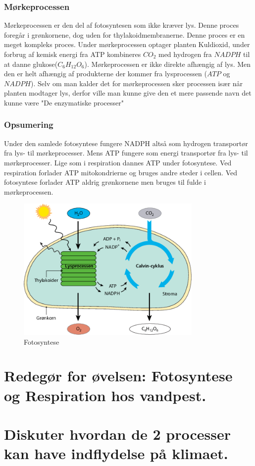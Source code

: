             \subsubsection{Mørkeprocessen}
                Mørkeprocessen er den del af fotosyntesen som ikke kræver lys. Denne proces foregår i grønkornene, dog uden for thylakoidmembranerne. Denne proces er en meget kompleks proces. 
                Under mørkeprocessen optager planten Kuldioxid, under forbrug af kemisk energi fra ATP kombineres \begin{math}CO_2\end{math} med hydrogen fra \begin{math}NADPH\end{math} til at danne glukose(\begin{math}C_6H_{12}O_6\end{math}). Mørkeprocessen er ikke direkte afhængig af lys. Men den er helt afhængig af produkterne der kommer fra lysprocessen (\begin{math}ATP\end{math} og \begin{math}NADPH\end{math}). Selv om man kalder det for mørkeprocessen sker processen især når planten modtager lys, derfor ville man kunne give den et mere passende navn det kunne være "De enzymatiske processer"
            \subsubsection{Opsumering} 
                Under den samlede fotosyntese fungere NADPH altså som hydrogen transportør fra lys- til mørkeprocesser. Mens ATP fungere som energi transportør fra lys- til mørkeprocesser. Lige som i respiration dannes ATP under fotosyntese. Ved respiration forlader ATP mitokondrierne og bruges andre steder i cellen. Ved fotosyntese forlader ATP aldrig grønkornene men bruges til fulde i mørkeprocessen.
                \begin{figure}[h]
                    \centering
                    \includegraphics[width=0.8\textwidth]{figurs/fotosyntese.png}
                    \caption{Fotosyntese}
                    \label{fig:fotosyntese}
                \end{figure}


    \section{Redegør for øvelsen: Fotosyntese og Respiration hos vandpest.}
    \section{Diskuter hvordan de 2 processer kan have indflydelse på klimaet.}